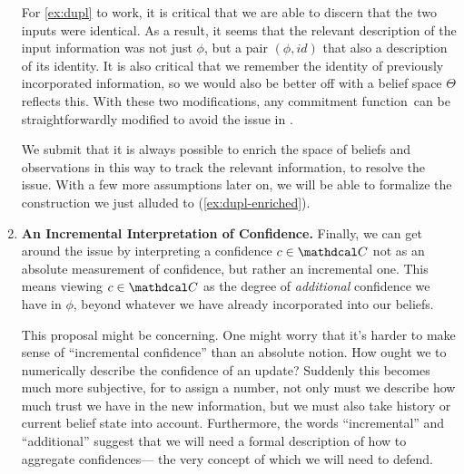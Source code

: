 \documentclass{article}
\def\cofunc{commitment function}
\def\confdom{\mathdcal C}
\begin{document}
\begin{enumerate}[label={\textbf{I\arabic*.}},ref={I\arabic*}]
	For \cref{ex:dupl} to work, it is critical that we are able to discern that the two inputs were identical.
	As a result, it seems that the relevant description of the input information was not just $\phi$, but a pair $(\phi, \mathit{id})$ that also a description of its identity.
	It is also critical that we remember the identity of previously incorporated information, so we would also be better off with a belief space $\Theta$ reflects this.  
	With these two modifications, any \cofunc\ can be straightforwardly modified to avoid the issue in . 

	
	We submit that it is always possible to enrich the space of beliefs and observations in this way to track the relevant information, to resolve the issue.
	With a few more assumptions later on, we will be able to formalize the construction we just alluded to (\cref{ex:dupl-enriched}).

	\item \textbf{An Incremental Interpretation of Confidence.}
		\label{approach:interperet}
	Finally, we can get around the issue by interpreting a confidence $c \in \confdom$ not as an absolute measurement of confidence, but rather an incremental one.  This means viewing $c \in \confdom$ as the degree of \emph{additional} confidence we have in $\phi$, beyond whatever we have already incorporated into our beliefs. 
	
	This proposal might be concerning.
	One might worry that it's harder to make sense of ``incremental confidence'' than an absolute notion.
	How ought we to numerically describe the confidence of an update? 
	Suddenly this becomes much more subjective, for to assign a number, not only must we describe how much trust we have in the new information, but we must also take history or current belief state into account.
	Furthermore, the words ``incremental'' and ``additional'' suggest that we will need a formal description of how to aggregate confidences---%
	the very concept of which we will need to defend.


\end{enumerate}
\end{document}
